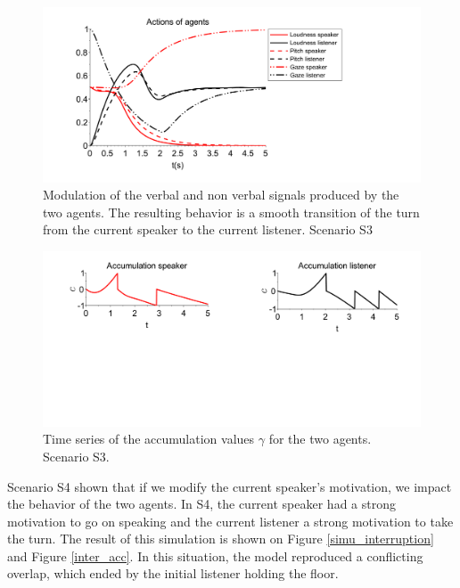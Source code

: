 \begin{figure}
  \centering
  \includegraphics[width=\linewidth]{figure/smooth-transition_signal-production.pdf}
  \caption{Modulation of the verbal and non verbal signals produced by the two agents. The resulting behavior is a smooth transition of the turn from the current speaker to the current listener. Scenario S3} 
  \label{simu_smooth}
\end{figure}

\begin{figure}
  \centering
  \includegraphics[width=\linewidth]{figure/smooth-transition_accumulation.pdf}
  \caption{Time series of the accumulation values $\gamma$ for the two agents. Scenario S3.}
  \label{smooth_acc}
\end{figure}

Scenario S4 shown that if we modify the current speaker's motivation, we impact the behavior of the two agents. In S4, the current speaker had a strong motivation to go on speaking and the current listener a strong motivation to take the turn. The result of this simulation is shown on Figure \ref{simu_interruption} and  Figure \ref{inter_acc}. In this situation, the model reproduced a conflicting overlap, which ended by the initial listener holding the floor.  

